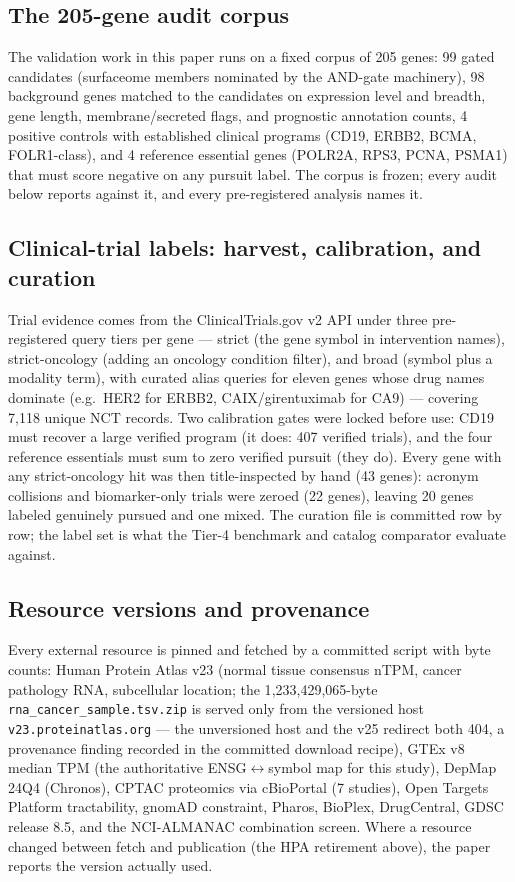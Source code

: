 \documentclass[11pt]{article}
\begin{document}
\subsection{The 205-gene audit corpus}
The validation work in this paper runs on a fixed corpus of 205 genes: 99
gated candidates (surfaceome members nominated by the AND-gate machinery), 98
background genes matched to the candidates on expression level and breadth,
gene length, membrane/secreted flags, and prognostic annotation counts, 4
positive controls with established clinical programs (CD19, ERBB2, BCMA,
FOLR1-class), and 4 reference essential genes (POLR2A, RPS3, PCNA, PSMA1) that
must score negative on any pursuit label. The corpus is frozen; every audit
below reports against it, and every pre-registered analysis names it.

\subsection{Clinical-trial labels: harvest, calibration, and curation}
Trial evidence comes from the ClinicalTrials.gov v2 API under three
pre-registered query tiers per gene --- strict (the gene symbol in
intervention names), strict-oncology (adding an oncology condition filter),
and broad (symbol plus a modality term), with curated alias queries for
eleven genes whose drug names dominate (e.g.\ HER2 for ERBB2, CAIX/girentuximab
for CA9) --- covering 7{,}118 unique NCT records. Two calibration gates were
locked before use: CD19 must recover a large verified program (it does: 407
verified trials), and the four reference essentials must sum to zero verified
pursuit (they do). Every gene with any strict-oncology hit was then
title-inspected by hand (43 genes): acronym collisions and biomarker-only
trials were zeroed (22 genes), leaving 20 genes labeled genuinely pursued and
one mixed. The curation file is committed row by row; the label set is what
the Tier-4 benchmark and catalog comparator evaluate against.

\subsection{Resource versions and provenance}
Every external resource is pinned and fetched by a committed script with byte
counts: Human Protein Atlas v23 (normal tissue consensus nTPM, cancer
pathology RNA, subcellular location; the 1{,}233{,}429{,}065-byte
\texttt{rna\_cancer\_sample.tsv.zip} is served only from the versioned host
\texttt{v23.proteinatlas.org} --- the unversioned host and the v25 redirect
both 404, a provenance finding recorded in the committed download recipe),
GTEx v8 median TPM (the authoritative ENSG$\leftrightarrow$symbol map for
this study), DepMap 24Q4 (Chronos), CPTAC proteomics via cBioPortal (7
studies), Open Targets Platform tractability, gnomAD constraint, Pharos,
BioPlex, DrugCentral, GDSC release 8.5, and the NCI-ALMANAC combination
screen. Where a resource changed between fetch and publication (the HPA
retirement above), the paper reports the version actually used.
\end{document}
